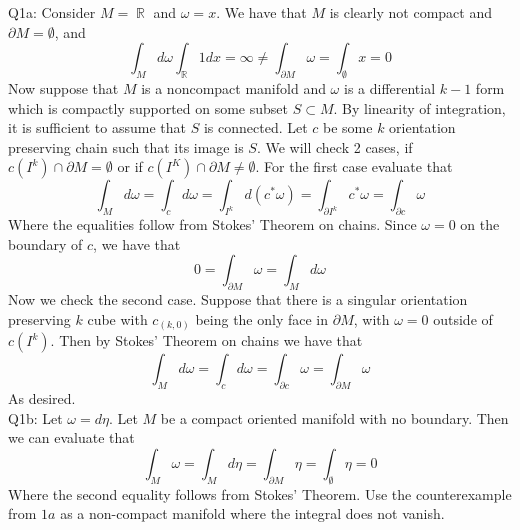 \documentclass[letterpaper]{article}
\DeclareMathOperator{\R}{\mathbb{R}}
\newcommand{\bd}{\partial}
\begin{document}
\noindent Q1a: Consider $M=\R$ and $\omega = x$. We have that $M$ is clearly not compact and $\bd M = \emptyset$, and $$\int_{M} d \omega \int_{\R} 1dx = \infty \neq \int_{\bd M} \omega = \int_{\emptyset} x=0$$ 
Now suppose that $M$ is a noncompact manifold and $\omega$ is a differential $k-1$ form which is compactly supported on some subset $S\subset M$. By linearity of integration, it is sufficient to assume that $S$ is connected. Let $c$ be some $k$ orientation preserving chain such that its image is $S$. We will check 2 cases, if $c(I^k)\cap \bd M = \emptyset$ or if $c(I^K) \cap \bd M \neq \emptyset$. For the first case evaluate that 
$$\int_{M} d\omega = \int_{c} d\omega = \int_{I^k} d(c^\ast \omega) = \int_{\bd I^k}c^\ast \omega = \int_{\bd c}\omega$$
Where the equalities follow from Stokes' Theorem on chains. Since $\omega=0$ on the boundary of $c$, we have that $$0= \int_{\bd M}\omega = \int_{M}d\omega$$
Now we check the second case. Suppose that there is a singular orientation preserving $k$ cube with $c_{(k,0)}$ being the only face in $\bd M$, with $\omega=0$ outside of $c(I^k)$. Then by Stokes' Theorem on chains we have that $$\int_{M}d\omega = \int_{c}d\omega = \int_{\bd c}\omega = \int_{\bd M}\omega $$
As desired. 
\newline \\ Q1b: Let $\omega = d\eta$. Let $M$ be a compact oriented manifold with no boundary. Then we can evaluate that $$\int_{M}\omega = \int_{M}d\eta = \int_{\bd M}\eta = \int_{\emptyset}\eta = 0$$ Where the second equality follows from Stokes' Theorem. Use the counterexample from $1a$ as a non-compact manifold where the integral does not vanish. 
\end{document}
